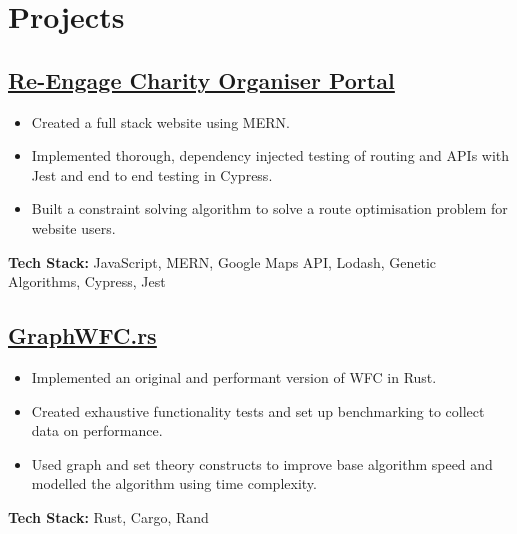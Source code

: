 \documentclass[12pt]{IEEEtran}
\begin{document}

\section*{\textbf{Projects}}
{
\color{blue}
\subsection*{\href{https://github.com/Tracht/charity-apr2020}{\underline{Re-Engage Charity Organiser Portal}}}
}
\begin{itemize}[topsep=\parskip]
\item Created a full stack website using MERN.
\item Implemented thorough, dependency injected testing of routing and APIs with Jest and end to end testing in Cypress.
\item Built a constraint solving algorithm to solve a route optimisation problem for website users.
\end{itemize}
\textbf{Tech Stack:} JavaScript, MERN, Google Maps API, Lodash, Genetic Algorithms, Cypress, Jest

{
\color{blue}
\subsection*{\href{https://github.com/SaiskiFunctions/GraphWFC.rs}{\underline{GraphWFC.rs}}}
}
\begin{itemize}[topsep=\parskip]
\item Implemented an original and performant version of WFC in Rust.
\item Created exhaustive functionality tests and set up benchmarking to collect data on performance.
\item Used graph and set theory constructs to improve base algorithm speed and modelled the algorithm using time complexity.
\end{itemize}
\textbf{Tech Stack:} Rust, Cargo, Rand

\iffalse
\subsection*{\href{https://github.com/dpwdec/Makersbnb}{Maker's B'n'B}}
\noindent{A full stack clone of Air B'n'B using entirely Ruby-based frameworks and libraries.} \\[5pt]
\textbf{Tech Stack:} Ruby, Sinatra, Sinatra-Flash, Bcrypt, Pony, RSpec, Capybara, PostgreSQL
\fi
\end{document}
